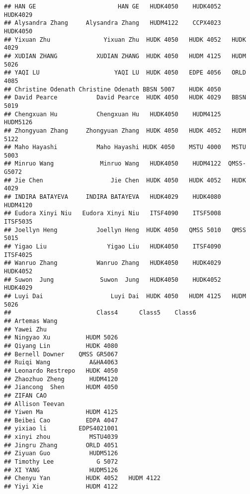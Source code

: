 \documentclass[]{article}
\begin{document}
\begin{verbatim}
## HAN GE                       HAN GE   HUDK4050    HUDK4052    HUDK4029
## Alysandra Zhang     Alysandra Zhang   HUDM4122    CCPX4023    HUDK4050
## Yixuan Zhu               Yixuan Zhu  HUDK 4050   HUDK 4052   HUDK 4029
## XUDIAN ZHANG           XUDIAN ZHANG  HUDK 4050   HUDM 4125   HUDM 5026
## YAQI LU                     YAQI LU  HUDK 4050   EDPE 4056   ORLD 4085
## Christine Odenath Christine Odenath BBSN 5007    HUDK 4050            
## David Pearce           David Pearce  HUDK 4050   HUDK 4029   BBSN 5019
## Chengxuan Hu           Chengxuan Hu   HUDK4050    HUDM4125    HUDM5126
## Zhongyuan Zhang     Zhongyuan Zhang  HUDK 4050   HUDK 4052   HUDM 5122
## Maho Hayashi           Maho Hayashi HUDK 4050    MSTU 4000   MSTU 5003
## Minruo Wang             Minruo Wang   HUDK4050    HUDM4122  QMSS-G5072
## Jie Chen                   Jie Chen  HUDK 4050   HUDK 4052   HUDK 4029
## INDIRA BATAYEVA     INDIRA BATAYEVA   HUDK4029    HUDK4080    HUDM4120
## Eudora Xinyi Niu   Eudora Xinyi Niu   ITSF4090    ITSF5008    ITSF5035
## Joellyn Heng           Joellyn Heng  HUDK 4050   QMSS 5010   QMSS 5015
## Yigao Liu                 Yigao Liu   HUDK4050    ITSF4090    ITSF4025
## Wanruo Zhang           Wanruo Zhang   HUDK4050    HUDK4029    HUDK4052
## Suwon  Jung             Suwon  Jung   HUDK4050    HUDK4052    HUDK4029
## Luyi Dai                   Luyi Dai  HUDK 4050   HUDM 4125   HUDM 5026
##                        Class4      Class5    Class6
## Artemas Wang                                       
## Yawei Zhu                                          
## Ningyao Xu          HUDM 5026                      
## Qiyang Lin          HUDK 4080                      
## Bernell Downer    QMSS GR5067                      
## Ruiqi Wang           A&HA4063                      
## Leonardo Restrepo   HUDK 4050                      
## Zhaozhuo Zheng       HUDM4120                      
## Jiancong  Shen      HUDM 4050                      
## ZIFAN CAO                                          
## Allison Teevan                                     
## Yiwen Ma            HUDM 4125                      
## Beibei Cao          EDPA 4047                      
## yixiao li         EDPS4021001                      
## xinyi zhou           MSTU4039                      
## Jingru Zhang        ORLD 4051                      
## Ziyuan Guo           HUDM5126                      
## Timothy Lee            G 5072                      
## XI YANG              HUDM5126                      
## Chenyu Yan          HUDK 4052   HUDM 4122          
## Yiyi Xie            HUDM 4122                      

\end{verbatim}
\end{document}
